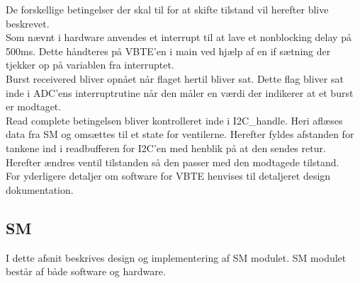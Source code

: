 De forskellige betingelser der skal til for at skifte tilstand vil herefter blive beskrevet. \\
Som nævnt i hardware anvendes et interrupt til at lave et nonblocking delay på 500ms. Dette håndteres på VBTE'en i main ved hjælp af en if sætning der tjekker op på variablen fra interruptet.\\
Burst receivered bliver opnået når flaget hertil bliver sat. Dette flag bliver sat inde i ADC'ens interruptrutine når den måler en værdi der indikerer at et burst er modtaget.\\
Read complete betingelsen bliver kontrolleret inde i I2C\_handle. Heri aflæses data fra SM og omsættes til et state for ventilerne. Herefter fyldes afstanden for tankene ind i readbufferen for I2C'en med henblik på at den sendes retur. Herefter ændres ventil tilstanden så den passer med den modtagede tilstand.\\
For yderligere detaljer om software for VBTE henvises til detaljeret design dokumentation.
\subsection{SM}
I dette afsnit beskrives design og implementering af SM modulet. SM modulet består af både software og hardware.
